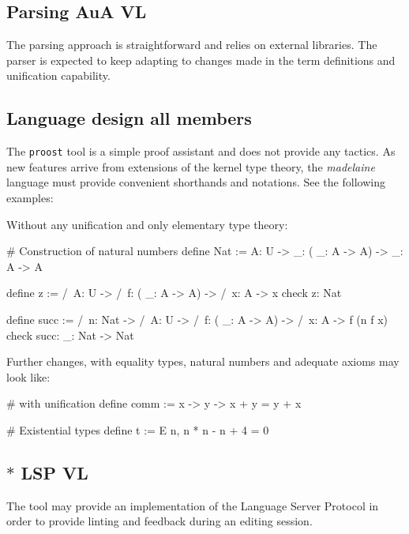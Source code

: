 \documentclass[twocolumn]{article}
\begin{document}
\subsection{Parsing \hfill\scriptsize AuA VL}
The parsing approach is straightforward and relies on external libraries. The
parser is expected to keep adapting to changes made in the term definitions and
unification capability.


\subsection{Language design \hfill\scriptsize all members}
The \texttt{proost} tool is a simple proof assistant and does not provide any
tactics. As new features arrive from extensions of the kernel type theory, the
\emph{madelaine} language must provide convenient shorthands and notations. See
the following examples:

Without any unification and only elementary type theory:
\begin{proost}
# Construction of natural numbers
define Nat := \/ A: U ->
  \/ _: (\/ _: A -> A) -> \/ _: A -> A

define z := /\ A: U ->
  /\ f: (\/ _: A -> A) -> /\ x: A -> x
check z: Nat

define succ := /\ n: Nat -> /\ A: U ->
  /\ f: (\/ _: A -> A) -> /\ x: A ->
  f (n f x)
check succ: \/ _: Nat -> Nat
\end{proost}

Further changes, with equality types, natural numbers and adequate axioms may
look like:
\begin{proost}
# with unification
define comm := \/ x -> \/ y -> x + y = y + x

# Existential types
define t := E n, n * n - n + 4 = 0
\end{proost}


\subsection{\(*\) LSP \hfill\scriptsize VL}
The tool may provide an implementation of the Language Server Protocol in
order to provide linting and feedback during an editing session.

\end{document}
